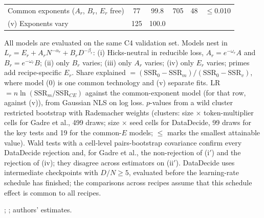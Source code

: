 \begin{table}[tp]
\begin{tabular}{@{}lccccc@{}}
Common exponents ($A_r$, $B_r$, $E_r$ free) & 77 & 99.8 & 705 & 48 & $\leq$0.010 \\
(v) Exponents vary & 125 & 100.0 & & & \\
\bottomrule
\end{tabular}
\par\smallskip
\begin{tablenotes}All models are evaluated on the same C4 validation set. Models nest in
$L_r=E_r+A_rN^{-\alpha_r}+B_rD^{-\beta_r}$: (i) Hicks-neutral in reducible loss, $A_r=e^{-\omega_r}A$ and
$B_r=e^{-\omega_r}B$; (ii) only $B_r$ varies; (iii) only $A_r$ varies; (iv) only $E_r$ varies; primes add
recipe-specific $E_r$. Share explained $=(\mathrm{SSR}_0-\mathrm{SSR}_m)/(\mathrm{SSR}_0-\mathrm{SSR}_v)$, where model
(0) is one common technology and (v) separate fits. LR $=n\ln(\mathrm{SSR}_m/\mathrm{SSR}_{CE})$ against the
common-exponent model (for that row, against (v)), from Gaussian NLS on log loss. $p$-values from a wild cluster
restricted bootstrap with Rademacher weights (clusters: size $\times$ token-multiplier cells for Gadre et al., 499
draws; size $\times$ seed cells for DataDecide, 99 draws for the key tests and 19 for the common-$E$ models;
$\leq$ marks the smallest attainable value). Wald tests with a cell-level pairs-bootstrap covariance confirm every
DataDecide rejection and, for Gadre et al., the non-rejection of (i$'$) and the rejection of (iv); they disagree
across estimators on (ii$'$). DataDecide uses intermediate checkpoints with $D/N\geq5$, evaluated before the
learning-rate schedule has finished; the comparisons across recipes assume that this schedule effect is common to all
recipes.\end{tablenotes}
\begin{tablenotes}[Source]\citet{gadre2024language}; \citet{magnusson2025datadecide}; authors'
estimates.\end{tablenotes}
\end{table}
